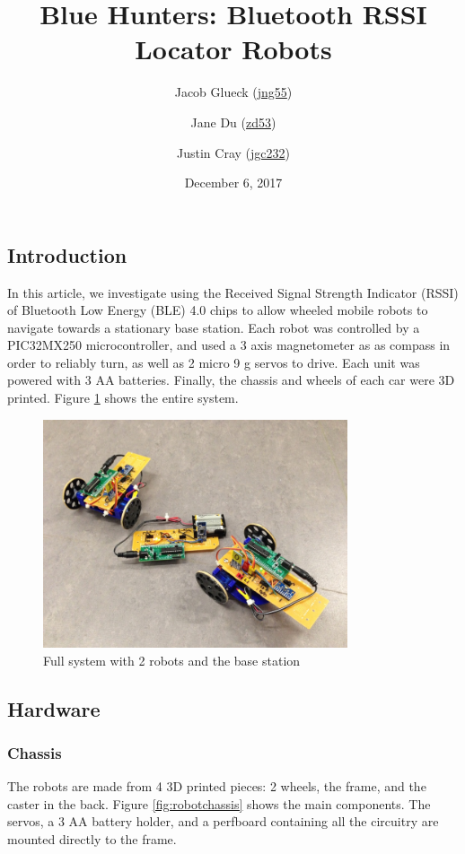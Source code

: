 \documentclass[]{article}
\title{Blue Hunters: Bluetooth RSSI Locator Robots}
\author{Jacob Glueck (\href{mailto:jng55@cornell.edu}{jng55}) \and Jane Du (\href{mailto:zd53@cornell.edu}{zd53}) \and Justin Cray (\href{mailto:jgc232@cornell.edu}{jgc232})}
\date{December 6, 2017}
\begin{document}
\maketitle

\hypertarget{introduction}{%
\subsection{Introduction}\label{introduction}}

In this article, we investigate using the Received Signal Strength Indicator (RSSI) of Bluetooth Low Energy (BLE) 4.0 chips to allow wheeled mobile robots to navigate towards a stationary base station.
Each robot was controlled by a PIC32MX250 microcontroller, and used a 3 axis magnetometer as as compass in order to reliably turn, as well as 2 micro 9 g servos to drive.
Each unit was powered with 3 AA batteries.
Finally, the chassis and wheels of each car were 3D printed.
Figure \ref{fig:robotsystem} shows the entire system.

\begin{figure}
  \centering
  \includegraphics[width=0.8\textwidth]{full_system.jpg}
  \caption{Full system with 2 robots and the base station}
  \label{fig:robotsystem}
\end{figure}

\subsection{Hardware}

\subsubsection{Chassis}

The robots are made from 4 3D printed pieces: 2 wheels, the frame, and
the caster in the back.
Figure \ref{fig:robotchassis} shows the main components.
The servos, a 3 AA battery holder, and a perfboard containing all the circuitry are mounted directly to the frame.
\end{document}
